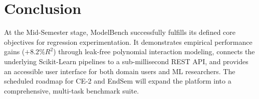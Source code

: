 \documentclass[11pt,a4paper]{article}
\begin{document}
\section{Conclusion}
\label{sec:conclusion}
At the Mid-Semester stage, ModelBench successfully fulfills its defined core objectives for regression experimentation. It demonstrates empirical performance gains ($+8.2\% R^2$) through leak-free polynomial interaction modeling, connects the underlying Scikit-Learn pipelines to a sub-millisecond REST API, and provides an accessible user interface for both domain users and ML researchers. The scheduled roadmap for CE-2 and EndSem will expand the platform into a comprehensive, multi-task benchmark suite.
\end{document}

